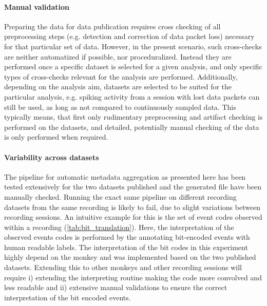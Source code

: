 \paragraph{Manual validation}
Preparing the data for data publication requires cross checking of all preprocessing steps (e.g. detection and correction of data packet loss) necessary for that particular set of data. However, in the present scenario, such cross-checks are neither automatized if possible, nor proceduralized. Instead they are performed once a specific dataset is selected for a given analysis, and only specific types of cross-checks relevant for the analysis are performed. Additionally, depending on the analysis aim, datasets are selected to be suited for the particular analysis, e.g. spiking activity from a session with lost data packets can still be used, as long as not compared to continuously sampled data.  This typically means, that first only rudimentary preprocessing and artifact checking is performed on the datasets, and detailed, potentially manual checking of the data is only performed when required. 

\paragraph{Variability across datasets}
The pipeline for automatic metadata aggregation as presented here has been tested extensively for the two datasets published and the generated file have been manually checked. Running the exact same pipeline on different recording datasets from the same recording is likely to fail, due to slight variations between recording sessions. An intuitive example for this is the set of event codes observed within a recording (\cref{tab:bit_translation}). Here, the interpretation of the observed events codes is performed by the  annotating bit-encoded events with human readable labels. The interpretation of the bit codes in this experiment highly depend on the monkey and was implemented based on the two published datasets. Extending this to other monkeys and other recording sessions will require i) extending the interpreting routine making the code more convolved and less readable and ii) extensive manual validations to ensure the correct interpretation of the bit encoded events.

